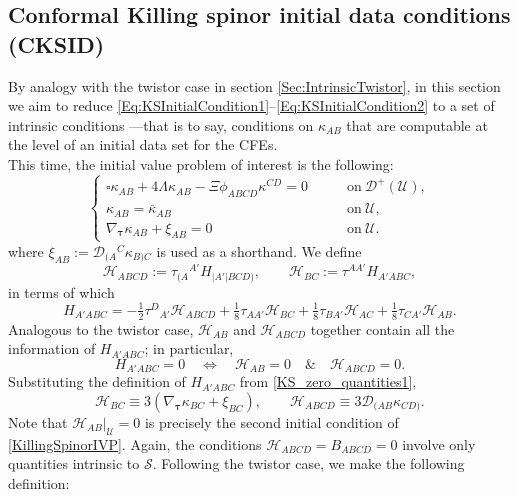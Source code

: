 \documentclass[10pt,a4paper]{article}
\theoremstyle{plain}
\begin{document}
\subsection{Conformal Killing spinor initial data conditions (CKSID)}
\label{IntrinsicCKSID}

By analogy with the twistor case in section
\ref{Sec:IntrinsicTwistor}, in this section we aim to reduce
\eqref{Eq:KSInitialCondition1}--\eqref{Eq:KSInitialCondition2} to a
set of intrinsic conditions ---that is to say, conditions on
$\kappa_{AB}$ that are computable at the level of an initial data set
for the CFEs.  \\

This time, the initial value problem of interest is the following:
\begin{equation}\label{KillingSpinorIVP}
    \left\{
\begin{array}{ll}
	 \square \kappa_{AB} + 4 \Lambda\kappa_{AB} - \Xi
         \phi_{ABCD}\kappa^{CD} = 0 & \qquad
         \text{on}~\mathcal{D}^{+}(\mathcal{U}),\\ \kappa_{AB} =
         \bar{\kappa}_{AB}
         &\qquad\text{on}~\mathcal{U},\\ \nabla_{\bm\tau} \kappa_{AB}
         + \xi_{AB} = 0 &\qquad\text{on}~\mathcal{U}.
\end{array} \right.
\end{equation}
where $\xi_{AB}:=\mathcal{D}_{(A}{}^C\kappa_{B)C}$ is used as a
shorthand.  We define
\[\mathcal{H}_{ABCD}:=\tau_{(A}{}^{A'}H_{\vert A'\vert BCD)}, \qquad \mathcal{H}_{BC}:=\tau^{AA'}H_{A'ABC}, \]
in terms of which
\[H_{A'ABC} = -\tfrac{1}{2}\tau^D{}_{A'}\mathcal{H}_{ABCD} +
\tfrac{1}{8}\tau_{AA'}\mathcal{H}_{BC} + \tfrac{1}{8}\tau_{BA'}\mathcal{H}_{AC}
+ \tfrac{1}{8}\tau_{CA'}\mathcal{H}_{AB}. \]
Analogous to the twistor case, $\mathcal{H}_{AB}$ and
$\mathcal{H}_{ABCD}$ together contain all the information of
$H_{A'ABC}$; in particular,
\[
H_{A'ABC}=0 \quad \iff \quad \mathcal{H} _{AB}=0 \quad \& \quad
\mathcal{H}_{ABCD}=0.
\]
Substituting the definition of $H_{A'ABC}$ from
\eqref{KS_zero_quantities1},
\begin{equation}
\mathcal{H}_{BC}\equiv 3(\nabla_{\bm\tau} \kappa_{BC} + \xi_{BC}),
\qquad \mathcal{H}_{ABCD} \equiv
3\mathcal{D}_{(AB}\kappa_{CD)}. \label{Eq:SpatialKS}
\end{equation}
Note that $\mathcal{H}_{AB}|_{\mathcal{U}}=0$ is precisely the second
initial condition of \eqref{KillingSpinorIVP}. Again, the conditions
$\mathcal{H}_{ABCD}=B_{ABCD}=0$ involve only quantities intrinsic to
$\mathcal{S}$. Following the twistor case, we make the following
definition:
\end{document}
